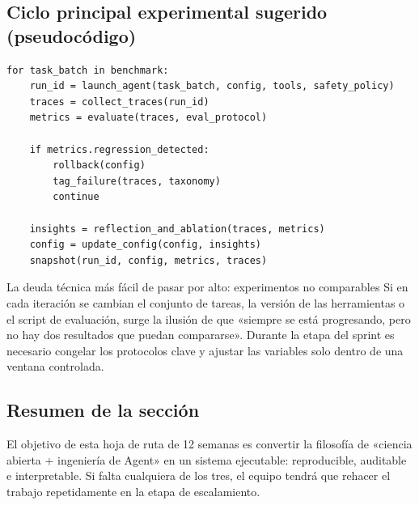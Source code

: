 \subsection{Ciclo principal experimental sugerido (pseudocódigo)}
\begin{lstlisting}[caption={Research Loop: ciclo principal de iteración reproducible de Agent},label={lst:research-loop}]
for task_batch in benchmark:
    run_id = launch_agent(task_batch, config, tools, safety_policy)
    traces = collect_traces(run_id)
    metrics = evaluate(traces, eval_protocol)

    if metrics.regression_detected:
        rollback(config)
        tag_failure(traces, taxonomy)
        continue

    insights = reflection_and_ablation(traces, metrics)
    config = update_config(config, insights)
    snapshot(run_id, config, metrics, traces)
\end{lstlisting}

\begin{warningbox}{La deuda técnica más fácil de pasar por alto: experimentos no comparables}
Si en cada iteración se cambian el conjunto de tareas, la versión de las herramientas o el script de evaluación, surge la ilusión de que «siempre se está progresando, pero no hay dos resultados que puedan compararse».  
Durante la etapa del sprint es necesario congelar los protocolos clave y ajustar las variables solo dentro de una ventana controlada.
\end{warningbox}

\subsection{Resumen de la sección}
El objetivo de esta hoja de ruta de 12 semanas es convertir la filosofía de «ciencia abierta + ingeniería de Agent» en un sistema ejecutable: reproducible, auditable e interpretable. Si falta cualquiera de los tres, el equipo tendrá que rehacer el trabajo repetidamente en la etapa de escalamiento.


